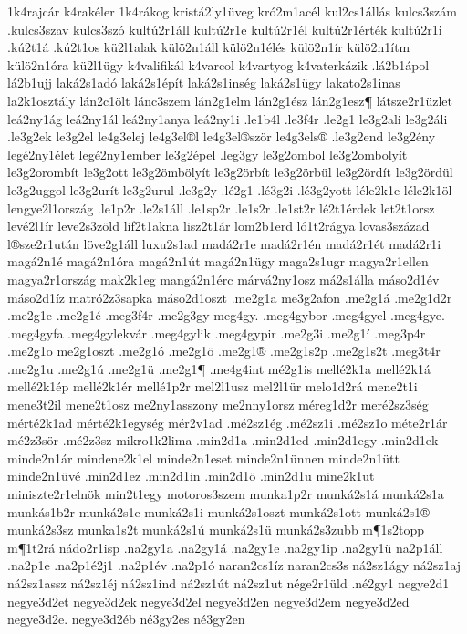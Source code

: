 {1k4rajcár
k4rakéler
1k4rákog
kristá2ly1üveg
kró2m1acél
kul2cs1állás
kulcs3szám
.kulcs3szav
kulcs3szó
kultú2r1áll
kultú2r1e
kultú2r1él
kultú2r1érték
kultú2r1i
.kú2t1á
.kú2t1os
kü2l1alak
külö2n1áll
külö2n1élés
külö2n1ír
külö2n1ítm
külö2n1óra
kü2l1ügy
k4valifikál
k4varcol
k4vartyog
k4vaterkázik
.lá2b1ápol
lá2b1ujj
laká2s1adó
laká2s1épít
laká2s1inség
laká2s1ügy
lakato2s1inas
la2k1osztály
lán2c1ölt
lánc3szem
lán2g1elm
lán2g1ész
lán2g1esz¶
látsze2r1üzlet
leá2ny1ág
leá2ny1ál
leá2ny1anya
leá2ny1i
.le1b4l
.le3f4r
.le2g1
le3g2ali
le3g2áli
.le3g2ek
le3g2el
le4g3elej
le4g3el®l
le4g3el®ször
le4g3els®
.le3g2end
le3g2ény
legé2ny1élet
legé2ny1ember
le3g2épel
.leg3gy
le3g2ombol
le3g2ombolyít
le3g2orombít
le3g2ott
le3g2ömbölyít
le3g2örbít
le3g2örbül
le3g2ördít
le3g2ördül
le3g2uggol
le3g2urít
le3g2urul
.le3g2y
.lé2g1
.lé3g2i
.lé3g2yott
léle2k1e
léle2k1öl
lengye2l1ország
.le1p2r
.le2s1áll
.le1sp2r
.le1s2r
.le1st2r
lé2t1érdek
let2t1orsz
levé2l1ír
leve2s3zöld
lif2t1akna
lisz2t1ár
lom2b1erd
ló1t2rágya
lovas3század
l®sze2r1után
löve2g1áll
luxu2s1ad
madá2r1e
madá2r1én
madá2r1ét
madá2r1i
magá2n1é    %
magá2n1óra
magá2n1út
magá2n1ügy
maga2s1ugr
magya2r1ellen
magya2r1ország
mak2k1eg
mangá2n1érc
márvá2ny1osz
má2s1álla
máso2d1év
máso2d1íz
matró2z3sapka
máso2d1oszt
.me2g1a
me3g2afon
.me2g1á
.me2g1d2r
.me2g1e
.me2g1é
.meg3f4r
.me2g3gy
meg4gy.
.meg4gybor
.meg4gyel
.meg4gye.
.meg4gyfa
.meg4gylekvár
.meg4gylik
.meg4gypir
.me2g3i
.me2g1í
.meg3p4r
.me2g1o
me2g1oszt
.me2g1ó
.me2g1ö
.me2g1®
.me2g1s2p
.me2g1s2t
.meg3t4r
.me2g1u
.me2g1ú
.me2g1ü
.me2g1¶
.me4g4int
mé2g1is
mellé2k1a
mellé2k1á
mellé2k1ép
mellé2k1ér
mellé1p2r
mel2l1usz
mel2l1ür
melo1d2rá
mene2t1i
mene3t2il %
mene2t1osz
me2ny1asszony
me2nny1orsz
méreg1d2r
meré2sz3ség
mérté2k1ad
mérté2k1egység
mér2v1ad
.mé2sz1ég
.mé2sz1i
.mé2sz1o
méte2r1ár
mé2z3sör
.mé2z3sz
mikro1k2lima
.min2d1a
.min2d1ed
.min2d1egy
.min2d1ek
minde2n1ár
mindene2k1el
minde2n1eset
minde2n1ünnen
minde2n1ütt          %
minde2n1üvé          %
.min2d1ez
.min2d1in
.min2d1ö
.min2d1u
mine2k1ut
miniszte2r1elnök
min2t1egy
motoros3szem
munka1p2r
munká2s1á
munká2s1a
munkás1b2r
munká2s1e
munká2s1i
munká2s1oszt
munká2s1ott
munká2s1®
munká2s3sz
munka1s2t
munká2s1ú
munká2s1ü
munká2s3zubb
m¶1s2topp
m¶1t2rá
nádo2r1isp
.na2gy1a
.na2gy1á
.na2gy1e
.na2gy1ip
.na2gy1ü
na2p1áll
.na2p1e
.na2p1é2j1 %
.na2p1év
.na2p1ó
naran2cs1íz
naran2cs3s
ná2sz1ágy
ná2sz1aj
ná2sz1assz
ná2sz1éj
ná2sz1ind
ná2sz1út
ná2sz1ut
nége2r1üld
.né2gy1
negye2d1
negye3d2et
negye3d2ek
negye3d2el
negye3d2en
negye3d2em
negye3d2ed
negye3d2e.
negye3d2éb %
né3gy2es
né3gy2en
}
